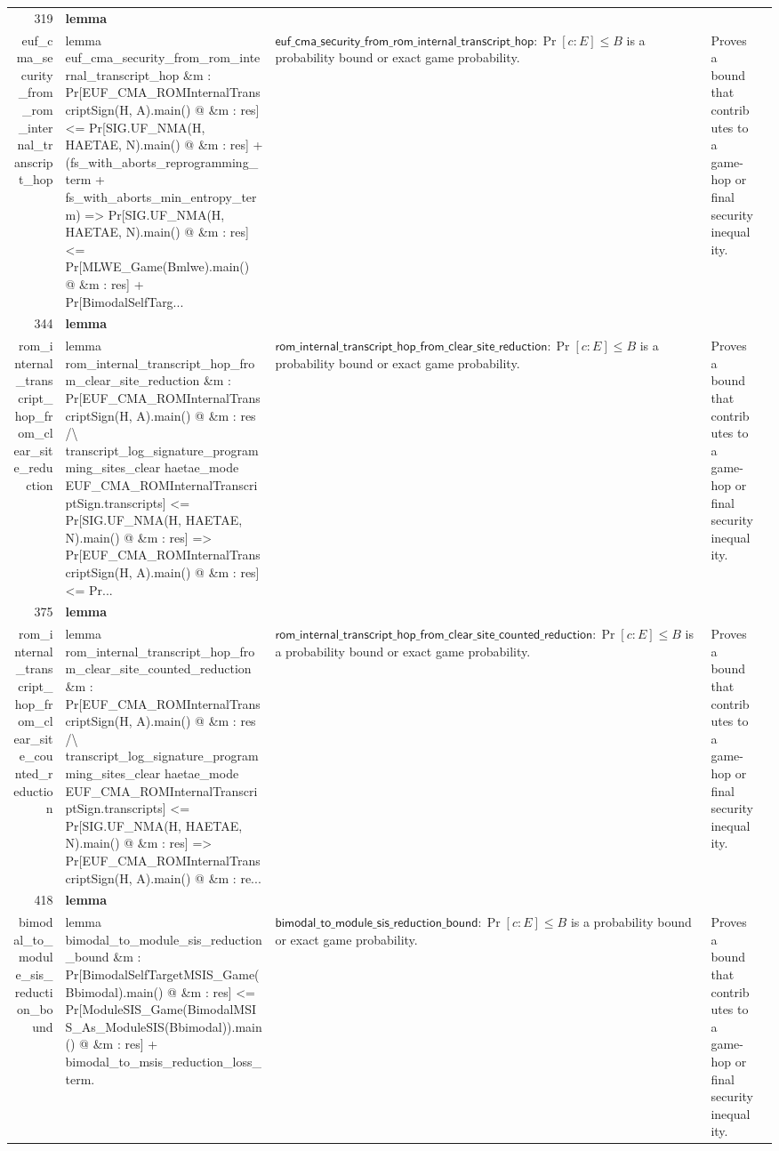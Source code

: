 \documentclass[10pt]{article}
\newcommand{\ec}[1]{\begingroup\ttfamily\scriptsize #1\endgroup}
\begin{document}
\begin{longtable}{r L{0.17\textwidth} L{0.26\textwidth} L{0.27\textwidth} L{0.20\textwidth}}
319 & \textbf{lemma}\\\ec{euf\_cma\_security\_from\_rom\_internal\_transcript\_hop} & \ec{lemma euf\_cma\_security\_from\_rom\_internal\_transcript\_hop \&m : Pr[EUF\_CMA\_ROMInternalTranscriptSign(H, A).main() @ \&m : res] <= Pr[SIG.UF\_NMA(H, HAETAE, N).main() @ \&m : res] + (fs\_with\_aborts\_reprogramming\_term + fs\_with\_aborts\_min\_entropy\_term) => Pr[SIG.UF\_NMA(H, HAETAE, N).main() @ \&m : res] <= Pr[MLWE\_Game(Bmlwe).main() @ \&m : res] + Pr[BimodalSelfTarg...} & \(\mathsf{euf\_cma\_security\_from\_rom\_internal\_transcript\_hop} : \Pr[c : E] \le B\) is a probability bound or exact game probability. & Proves a bound that contributes to a game-hop or final security inequality. \\
344 & \textbf{lemma}\\\ec{rom\_internal\_transcript\_hop\_from\_clear\_site\_reduction} & \ec{lemma rom\_internal\_transcript\_hop\_from\_clear\_site\_reduction \&m : Pr[EUF\_CMA\_ROMInternalTranscriptSign(H, A).main() @ \&m : res /\textbackslash{} transcript\_log\_signature\_programming\_sites\_clear haetae\_mode EUF\_CMA\_ROMInternalTranscriptSign.transcripts] <= Pr[SIG.UF\_NMA(H, HAETAE, N).main() @ \&m : res] => Pr[EUF\_CMA\_ROMInternalTranscriptSign(H, A).main() @ \&m : res] <= Pr...} & \(\mathsf{rom\_internal\_transcript\_hop\_from\_clear\_site\_reduction} : \Pr[c : E] \le B\) is a probability bound or exact game probability. & Proves a bound that contributes to a game-hop or final security inequality. \\
375 & \textbf{lemma}\\\ec{rom\_internal\_transcript\_hop\_from\_clear\_site\_counted\_reduction} & \ec{lemma rom\_internal\_transcript\_hop\_from\_clear\_site\_counted\_reduction \&m : Pr[EUF\_CMA\_ROMInternalTranscriptSign(H, A).main() @ \&m : res /\textbackslash{} transcript\_log\_signature\_programming\_sites\_clear haetae\_mode EUF\_CMA\_ROMInternalTranscriptSign.transcripts] <= Pr[SIG.UF\_NMA(H, HAETAE, N).main() @ \&m : res] => Pr[EUF\_CMA\_ROMInternalTranscriptSign(H, A).main() @ \&m : re...} & \(\mathsf{rom\_internal\_transcript\_hop\_from\_clear\_site\_counted\_reduction} : \Pr[c : E] \le B\) is a probability bound or exact game probability. & Proves a bound that contributes to a game-hop or final security inequality. \\
418 & \textbf{lemma}\\\ec{bimodal\_to\_module\_sis\_reduction\_bound} & \ec{lemma bimodal\_to\_module\_sis\_reduction\_bound \&m : Pr[BimodalSelfTargetMSIS\_Game(Bbimodal).main() @ \&m : res] <= Pr[ModuleSIS\_Game(BimodalMSIS\_As\_ModuleSIS(Bbimodal)).main() @ \&m : res] + bimodal\_to\_msis\_reduction\_loss\_term.} & \(\mathsf{bimodal\_to\_module\_sis\_reduction\_bound} : \Pr[c : E] \le B\) is a probability bound or exact game probability. & Proves a bound that contributes to a game-hop or final security inequality. \\

\end{longtable}
\end{document}
